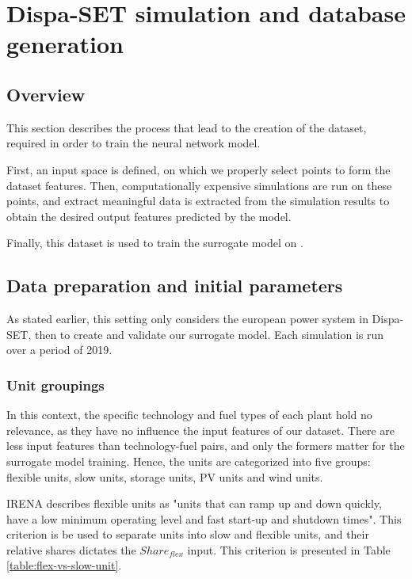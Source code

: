 \section{Dispa-SET simulation and database generation}

\subsection{Overview}

This section describes the process that lead to the creation of the dataset, required in order to train the neural network model.

First, an input space is defined, on which we properly select points to form the dataset features. Then, computationally expensive simulations are run on these points, and extract meaningful data is extracted from the simulation results to obtain the desired output features predicted by the model.

Finally, this dataset is used to train the surrogate model on \cite{surrogate_model}.

\subsection{Data preparation and initial parameters}

As stated earlier, this setting only considers the european power system in Dispa-SET, then to create and validate our surrogate model. Each simulation is run over a period of 2019.

\subsubsection{Unit groupings}
In this context, the specific technology and fuel types of each plant hold no relevance, as they have no influence the input features of our dataset. There are less input features than technology-fuel pairs, and only the formers matter for the surrogate model training. Hence, the units are categorized into five groups: flexible units, slow units, storage units, PV units and wind units.

IRENA \cite{irena} describes flexible units as "units that can ramp up and down quickly, have a low minimum operating level and fast start-up and shutdown times". This criterion is be used to separate units into slow and flexible units, and their relative shares dictates the $Share_{flex}$ input. This criterion is presented in Table \ref{table:flex-vs-slow-unit}.

